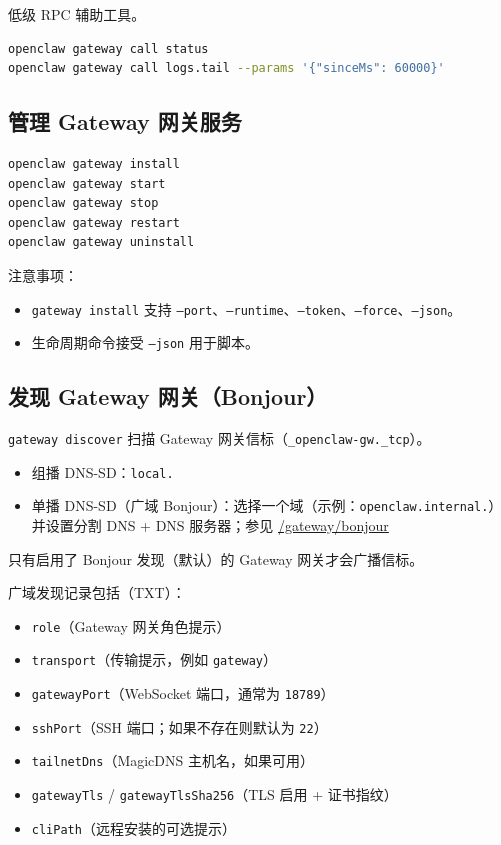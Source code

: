 低级 RPC 辅助工具。

\begin{lstlisting}[language=bash]
openclaw gateway call status
openclaw gateway call logs.tail --params '{"sinceMs": 60000}'
\end{lstlisting}


\subsection{管理 Gateway 网关服务}


\begin{lstlisting}[language=bash]
openclaw gateway install
openclaw gateway start
openclaw gateway stop
openclaw gateway restart
openclaw gateway uninstall
\end{lstlisting}


注意事项：

\begin{itemize}
  \item \texttt{gateway install} 支持 \texttt{--port}、\texttt{--runtime}、\texttt{--token}、\texttt{--force}、\texttt{--json}。
  \item 生命周期命令接受 \texttt{--json} 用于脚本。
\end{itemize}


\subsection{发现 Gateway 网关（Bonjour）}


\texttt{gateway discover} 扫描 Gateway 网关信标（\texttt{\_openclaw-gw.\_tcp}）。

\begin{itemize}
  \item 组播 DNS-SD：\texttt{local.}
  \item 单播 DNS-SD（广域 Bonjour）：选择一个域（示例：\texttt{openclaw.internal.}）并设置分割 DNS + DNS 服务器；参见 \href{/gateway/bonjour}{/gateway/bonjour}
\end{itemize}


只有启用了 Bonjour 发现（默认）的 Gateway 网关才会广播信标。

广域发现记录包括（TXT）：

\begin{itemize}
  \item \texttt{role}（Gateway 网关角色提示）
  \item \texttt{transport}（传输提示，例如 \texttt{gateway}）
  \item \texttt{gatewayPort}（WebSocket 端口，通常为 \texttt{18789}）
  \item \texttt{sshPort}（SSH 端口；如果不存在则默认为 \texttt{22}）
  \item \texttt{tailnetDns}（MagicDNS 主机名，如果可用）
  \item \texttt{gatewayTls} / \texttt{gatewayTlsSha256}（TLS 启用 + 证书指纹）
  \item \texttt{cliPath}（远程安装的可选提示）
\end{itemize}


